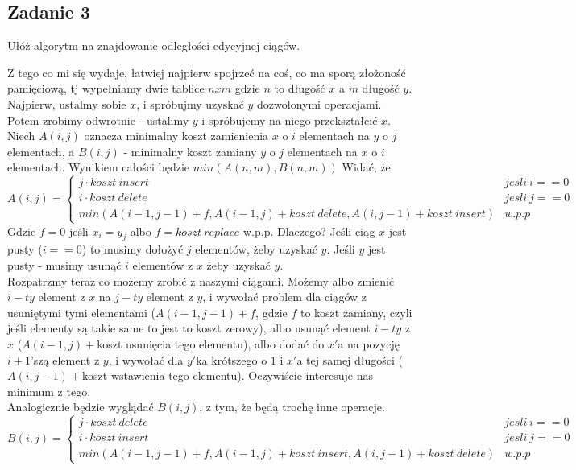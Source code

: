 \documentclass[a4paper]{article}
\begin{document}
\subsection*{Zadanie 3}
Ułóż algorytm na znajdowanie odległości edycyjnej ciągów.

Z tego co mi się wydaje, łatwiej najpierw spojrzeć na coś, co ma sporą złożoność pamięciową, tj wypełniamy dwie tablice $nxm$ gdzie $n$ to długość $x$ a $m$ długość $y$.\\
Najpierw, ustalmy sobie $x$, i spróbujmy uzyskać $y$ dozwolonymi operacjami. Potem zrobimy odwrotnie - ustalimy $y$ i spróbujemy na niego przekształcić $x$. Niech $A(i,j)$ oznacza minimalny koszt zamienienia $x$ o $i$ elementach na $y$ o $j$ elementach, a $B(i,j)$ - minimalny koszt zamiany $y$ o $j$ elementach na $x$ o $i$ elementach.
Wynikiem całości będzie $min(A(n,m),B(n,m))$
Widać, że:
$$A(i,j)=\left\{\begin{matrix}
j\cdot koszt\ insert  & jesli\ i==0 \\ 
i\cdot koszt\ delete  & jesli\ j==0 \\ 
min(A(i-1,j-1)+f,A(i-1,j)+koszt\ delete,A(i,j-1)+koszt\ insert) & w.p.p 
\end{matrix}\right.$$
Gdzie $f=0$ jeśli $x_i=y_j$ albo $f=koszt\ replace$ w.p.p.
Dlaczego? Jeśli ciąg $x$ jest pusty ($i==0$) to musimy dołożyć $j$ elementów, żeby uzyskać $y$. Jeśli $y$ jest pusty - musimy usunąć $i$ elementów z $x$ żeby uzyskać $y$.\\
Rozpatrzmy teraz co możemy zrobić z naszymi ciągami. Możemy albo zmienić $i-ty$ element z $x$ na $j-ty$ element z $y$, i wywołać problem dla ciągów z usuniętymi tymi elementami ($A(i-1,j-1)+f$, gdzie $f$ to koszt zamiany, czyli jeśli elementy są takie same to jest to koszt zerowy), albo usunąć element $i-ty$ z $x$ ($A(i-1,j)+$koszt usunięcia tego elementu), albo dodać do $x'$a na pozycję $i+1$'szą element z $y$, i wywołać dla $y'$ka krótszego o $1$ i $x'$a tej samej długości ($A(i,j-1)+$koszt wstawienia tego elementu). Oczywiście interesuje nas minimum z tego.\\
Analogicznie będzie wyglądać $B(i,j)$, z tym, że będą trochę inne operacje.
$$B(i,j)=\left\{\begin{matrix}
j\cdot koszt\ delete  & jesli\ i==0 \\ 
i\cdot koszt\ insert  & jesli\ j==0 \\ 
min(A(i-1,j-1)+f,A(i-1,j)+koszt\ insert,A(i,j-1)+koszt\ delete) & w.p.p 
\end{matrix}\right.$$
\end{document}
